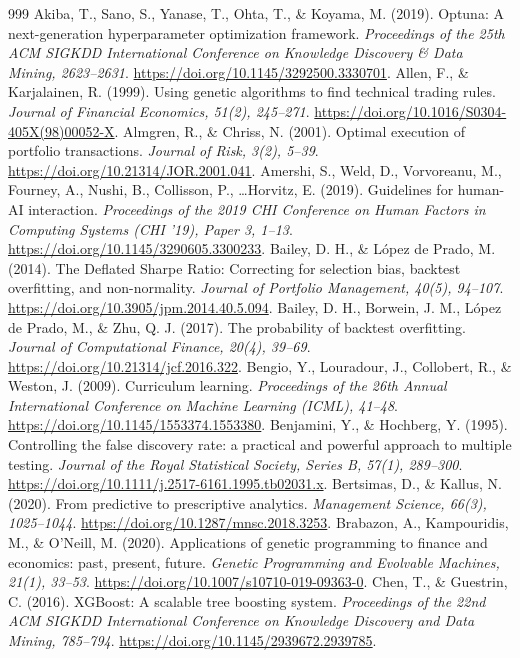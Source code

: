 \documentclass[11pt,a4paper]{article}
\begin{document}
\begin{thebibliography}{999}
 Akiba, T., Sano, S., Yanase, T., Ohta, T., \& Koyama, M. (2019). Optuna: A next-generation hyperparameter optimization framework. \emph{Proceedings of the 25th ACM SIGKDD International Conference on Knowledge Discovery \& Data Mining, 2623--2631}. \url{https://doi.org/10.1145/3292500.3330701}.
 Allen, F., \& Karjalainen, R. (1999). Using genetic algorithms to find technical trading rules. \emph{Journal of Financial Economics, 51(2), 245--271}. \url{https://doi.org/10.1016/S0304-405X(98)00052-X}.
 Almgren, R., \& Chriss, N. (2001). Optimal execution of portfolio transactions. \emph{Journal of Risk, 3(2), 5--39}. \url{https://doi.org/10.21314/JOR.2001.041}.
 Amershi, S., Weld, D., Vorvoreanu, M., Fourney, A., Nushi, B., Collisson, P., \ldots Horvitz, E. (2019). Guidelines for human-AI interaction. \emph{Proceedings of the 2019 CHI Conference on Human Factors in Computing Systems (CHI '19), Paper 3, 1--13}. \url{https://doi.org/10.1145/3290605.3300233}.
 Bailey, D. H., \& López de Prado, M. (2014). The Deflated Sharpe Ratio: Correcting for selection bias, backtest overfitting, and non-normality. \emph{Journal of Portfolio Management, 40(5), 94--107}. \url{https://doi.org/10.3905/jpm.2014.40.5.094}.
 Bailey, D. H., Borwein, J. M., López de Prado, M., \& Zhu, Q. J. (2017). The probability of backtest overfitting. \emph{Journal of Computational Finance, 20(4), 39--69}. \url{https://doi.org/10.21314/jcf.2016.322}.
 Bengio, Y., Louradour, J., Collobert, R., \& Weston, J. (2009). Curriculum learning. \emph{Proceedings of the 26th Annual International Conference on Machine Learning (ICML), 41--48}. \url{https://doi.org/10.1145/1553374.1553380}.
 Benjamini, Y., \& Hochberg, Y. (1995). Controlling the false discovery rate: a practical and powerful approach to multiple testing. \emph{Journal of the Royal Statistical Society, Series B, 57(1), 289--300}. \url{https://doi.org/10.1111/j.2517-6161.1995.tb02031.x}.
 Bertsimas, D., \& Kallus, N. (2020). From predictive to prescriptive analytics. \emph{Management Science, 66(3), 1025--1044}. \url{https://doi.org/10.1287/mnsc.2018.3253}.
 Brabazon, A., Kampouridis, M., \& O'Neill, M. (2020). Applications of genetic programming to finance and economics: past, present, future. \emph{Genetic Programming and Evolvable Machines, 21(1), 33--53}. \url{https://doi.org/10.1007/s10710-019-09363-0}.
 Chen, T., \& Guestrin, C. (2016). XGBoost: A scalable tree boosting system. \emph{Proceedings of the 22nd ACM SIGKDD International Conference on Knowledge Discovery and Data Mining, 785--794}. \url{https://doi.org/10.1145/2939672.2939785}.


\end{thebibliography}
\end{document}
